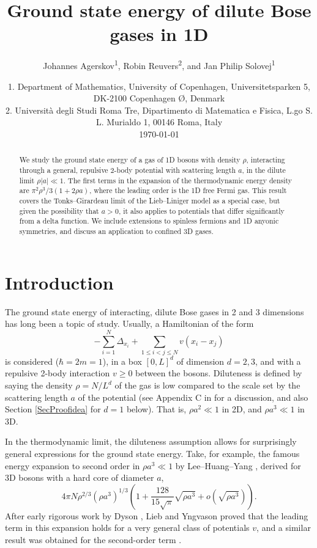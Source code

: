 \documentclass[a4paper,11pt]{article}
\author{Johannes Agerskov\textsuperscript{1}, Robin Reuvers\textsuperscript{2}, and Jan Philip Solovej\textsuperscript{1}}
\date{
1. Department of Mathematics, University of Copenhagen, Universitetsparken 5, DK-2100 Copenhagen \O, Denmark
	\\
2. Universit\`{a} degli Studi Roma Tre, Dipartimento di Matematica e Fisica, L.go S. L. Murialdo 1, 00146 Roma, Italy\\
	\today}
\title{Ground state energy of dilute Bose gases in 1D}
\numberwithin{equation}{section}
\begin{document}
\maketitle
\begin{abstract}
We study the ground state energy of a gas of 1D bosons with density $\rho$, interacting through a general, repulsive 2-body potential with scattering length $a$, in the dilute limit $\rho |a|\ll1$. The first terms in the expansion of the thermodynamic energy density are $\pi^2\rho^3/3(1+2\rho a)$, where the leading order is the 1D free Fermi gas. This result covers the Tonks--Girardeau limit of the Lieb--Liniger model as a special case, but given the possibility that $a>0$, it also applies to potentials that differ significantly from a delta function. We include extensions to spinless fermions and 1D anyonic symmetries, and discuss an application to confined 3D gases.
\end{abstract}


\section{Introduction}
The ground state energy of interacting, dilute Bose gases in 2 and 3 dimensions has long been a topic of study. Usually, a Hamiltonian of the form 
\begin{equation}
\label{Hgeneral}
-\sum^N_{i=1}\Delta_{x_i}+\sum_{1\leq i<j\leq N}v(x_i-x_j)
\end{equation}
is considered ($\hbar=2m=1$), in a box $[0,L]^d$ of dimension $d=2,3$, and with a repulsive 2-body interaction $v\geq0$ between the bosons. Diluteness is defined by saying the density $\rho=N/L^d$ of the gas is low compared to the scale set by the scattering length $a$ of the potential (see Appendix C in \cite{lieb2006mathematics} for a discussion, and also Section \ref{SecProofidea} for $d=1$ below). That is, $\rho a^2\ll1$ in 2D, and $\rho a^3\ll1$ in 3D.

In the thermodynamic limit, the diluteness assumption allows for surprisingly general expressions for the ground state energy. Take, for example, the famous energy expansion to second order in $\rho a^3\ll1$ by Lee--Huang--Yang \cite{lee1957eigenvalues}, derived for 3D bosons with a hard core of diameter $a$,
\begin{equation}
\label{result3D}
4\pi N\rho^{2/3} (\rho a^3)^{1/3}\left(1+\frac{128}{15\sqrt{\pi}}\sqrt{\rho a^3}+o\left(\sqrt{\rho a^3}\right)\right).
\end{equation}
After early rigorous work by Dyson \cite{dyson1957ground}, Lieb and Yngvason \cite{lieb1998ground} proved that the leading term in this expansion holds for a very general class of potentials $v$, and a similar result was obtained for the second-order term \cite{yau2009second,fournais2020energy,basti2021new,fournais2021energy}.
\end{document}
